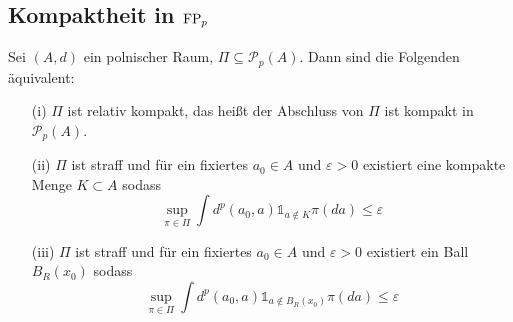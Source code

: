 \subsection{Kompaktheit in $\operatorname{FP}_p$}

\begin{theorem}\label{thm:prokhorov_in_pp}
    Sei $(A, d)$ ein polnischer Raum, $\Pi\subseteq\mathcal{P}_p(A)$. Dann sind die Folgenden äquivalent:
    \begin{enumerate}
        \item[(i)] $\Pi$ ist relativ kompakt, das heißt der Abschluss von $\Pi$ ist kompakt in $\mathcal{P}_p(A)$.
        \item[(ii)] $\Pi$ ist straff und für ein fixiertes $a_0 \in A$ und $\varepsilon>0$ existiert eine kompakte Menge $K\subset A$ sodass
        $$\sup_{\pi \in \Pi} \int d^p(a_0, a)\mathds{1}_{a \notin K} \pi(da) \leq \varepsilon$$
        \item[(iii)] $\Pi$ ist straff und für ein fixiertes $a_0 \in A$ und $\varepsilon>0$ existiert ein Ball $B_R(x_0)$ sodass
        $$\sup_{\pi \in \Pi} \int d^p(a_0, a)\mathds{1}_{a \notin B_R(x_0)} \pi(da) \leq \varepsilon$$
    \end{enumerate}
\end{theorem}
